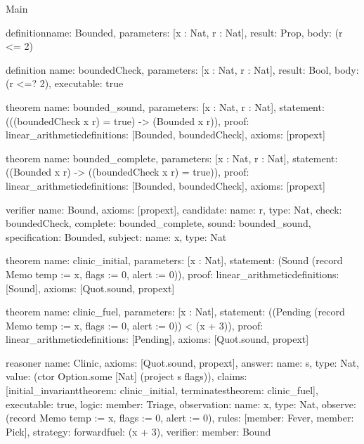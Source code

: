 \begin{lexlean}{Main}
\begin{semanticmodule}
definition{name: Bounded, parameters: [x : Nat, r : Nat], result: Prop, body: (r <= 2)}

definition{
  name: boundedCheck,
  parameters: [x : Nat, r : Nat],
  result: Bool,
  body: (r <=? 2),
  executable: true
}

theorem{
  name: bounded_sound,
  parameters: [x : Nat, r : Nat],
  statement: (((boundedCheck x r) = true) -> (Bounded x r)),
  proof: linear_arithmetic{definitions: [Bounded, boundedCheck]},
  axioms: [propext]
}

theorem{
  name: bounded_complete,
  parameters: [x : Nat, r : Nat],
  statement: ((Bounded x r) -> ((boundedCheck x r) = true)),
  proof: linear_arithmetic{definitions: [Bounded, boundedCheck]},
  axioms: [propext]
}

verifier{
  name: Bound,
  axioms: [propext],
  candidate: {name: r, type: Nat},
  check: boundedCheck,
  complete: bounded_complete,
  sound: bounded_sound,
  specification: Bounded,
  subject: {name: x, type: Nat}
}

theorem{
  name: clinic_initial,
  parameters: [x : Nat],
  statement: (Sound (record Memo {temp := x, flags := 0, alert := 0})),
  proof: linear_arithmetic{definitions: [Sound]},
  axioms: [Quot.sound, propext]
}

theorem{
  name: clinic_fuel,
  parameters: [x : Nat],
  statement: ((Pending (record Memo {temp := x, flags := 0, alert := 0})) < (x + 3)),
  proof: linear_arithmetic{definitions: [Pending]},
  axioms: [Quot.sound, propext]
}

reasoner{
  name: Clinic,
  axioms: [Quot.sound, propext],
  answer: {name: s, type: Nat, value: (ctor Option.some [Nat] (project s flags))},
  claims: [initial_invariant{theorem: clinic_initial}, terminates{theorem: clinic_fuel}],
  executable: true,
  logic: {member: Triage},
  observation: {name: x, type: Nat},
  observe: (record Memo {temp := x, flags := 0, alert := 0}),
  rules: [{member: Fever}, {member: Pick}],
  strategy: forward{fuel: (x + 3)},
  verifier: {member: Bound}
}
\end{semanticmodule}
\end{lexlean}
